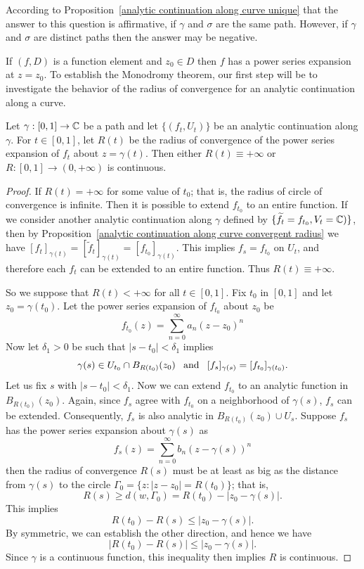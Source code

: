 According to Proposition~\ref{analytic continuation along curve unique} that the answer to this question is affirmative, if $\gamma$ and $\sigma$ are the same path. However, if $\gamma$ and $\sigma$ are distinct paths then the answer may be negative.\par
If $(f,D)$ is a function element and $z_0\in D$ then $f$ has a power series expansion at $z=z_0$. To establish the Monodromy theorem, our first step will be to investigate the behavior of the radius of convergence for an analytic continuation along a curve.
\begin{lemma}\label{analytic continuation along curve convergent radius}
Let $\gamma:[0,1]\to\mathbb{C}$ be a path and let $\{(f_t,U_t)\}$ be an analytic continuation along $\gamma$. For $t\in[0,1]$, let $R(t)$ be the radius of convergence of the power series expansion of $f_t$ about $z=\gamma(t)$. Then either $R(t)\equiv+\infty$ or $R:[0,1]\to(0,+\infty)$ is continuous.
\end{lemma}
\begin{proof}
If $R(t)=+\infty$ for some value of $t_0$; that is, the radius of circle of convergence is infinite. Then it is possible to extend $f_{t_0}$ to an entire function. If we consider another analytic continuation along $\gamma$ defined by $\{\widetilde{f}_t=f_{t_0},V_t=\mathbb{C})\}$, then by Proposition~\ref{analytic continuation along curve convergent radius} we have $[f_t]_{\gamma(t)}=[\widetilde{f}_t]_{\gamma(t)}=[f_{t_0}]_{\gamma(t)}$. This implies $f_s=f_{t_0}$ on $U_t$, and therefore each $f_t$ can be extended to an entire function. Thus $R(t)\equiv+\infty$.\par
So we suppose that $R(t)<+\infty$ for all $t\in[0,1]$. Fix $t_0$ in $[0,1]$ and let $z_0=\gamma(t_0)$. Let the power series expansion of $f_{t_0}$ about $z_0$ be
\[f_{t_0}(z)=\sum_{n=0}^{\infty}a_n(z-z_0)^n\]
Now let $\delta_1>0$ be such that $|s-t_0|<\delta_1$ implies
\[\gamma(s)\in U_{t_0}\cap B_{R(t_0)}(z_0)\hspace{8pt}\text{and}\hspace{8pt} [f_s]_{\gamma(s)}=[f_{t_0}]_{\gamma(t_0)}.\]
Let us fix $s$ with $|s-t_0|<\delta_1$. Now we can extend $f_{t_0}$ to an analytic function in $B_{R(t_0)}(z_0)$. Again, since $f_s$ agree with $f_{t_0}$ on a neighborhood of $\gamma(s)$, $f_s$ can be extended. Consequently, $f_s$ is also analytic in $B_{R(t_0)}(z_0)\cup U_s$. Suppose $f_s$ has the power series expansion about $\gamma(s)$ as
\[f_s(z)=\sum_{n=0}^{\infty}b_n(z-\gamma(s))^n\]
then the radius of convergence $R(s)$ must be at least as big as the distance from $\gamma(s)$ to the circle $\Gamma_0=\{z:|z-z_0|=R(t_0)\}$; that is,
\[R(s)\geq d(w,\Gamma_0)=R(t_0)-|z_0-\gamma(s)|.\]
This implies
\[R(t_0)-R(s)\leq|z_0-\gamma(s)|.\]
By symmetric, we can establish the other direction, and hence we have
\[|R(t_0)-R(s)|\leq|z_0-\gamma(s)|.\]
Since $\gamma$ is a continuous function, this inequality then implies $R$ is continuous.
\end{proof}
